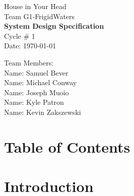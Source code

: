 \documentclass{article}
\begin{document}
\begin{titlepage}
    \begin{center}
        \begin{huge}
        House in Your Head \\[1cm]
        Team G1-FrigidWaters \\[2.2cm]
        { \bfseries System Design Specification } \\[1cm]
        Cycle \# 1\\[2.2cm]
        Date: \required\today\\[1cm]
        \end{huge}
    \end{center}
    \null \vfill
    \begin{large}
        Team Members: \\[0.5cm]
        Name: Samuel Bever\\[0.5cm]
        Name: Michael Conway\\[0.5cm]
        Name: Joseph Muoio\\[0.5cm]
        Name: Kyle Patron\\[0.5cm]
        Name: Kevin Zakszewski
    \end{large}
\end{titlepage}
\section*{\centering Table of Contents}
\makeatletter
{}
\newcommand{\hsubsubsection}{
\@startsection{subsubsection}{3}{\z@}%
                                     {-3.25ex\@plus -1ex \@minus -.2ex}%
                                     {-1.5ex \@plus -.2ex}%
                                     {R\normalfont\normalsize}}
\newcommand{\hparagraph}{
\@startsection{paragraph}{4}{\z@}%
                                     {-3.25ex\@plus -1ex \@minus -.2ex}%
                                     {-1.5ex \@plus -.2ex}%
                                     {R\normalfont\normalsize}}
\newcommand{\hsubparagraph}{
\@startsection{subparagraph}{5}{\z@}%
                                     {-3.25ex\@plus -1ex \@minus -.2ex}%
                                     {-1.5ex \@plus -.2ex}%
                                     {R\normalfont\normalsize}}
\setcounter{secnumdepth}{5}
\makeatother
\newpage
 

\section{Introduction}
\end{document}
